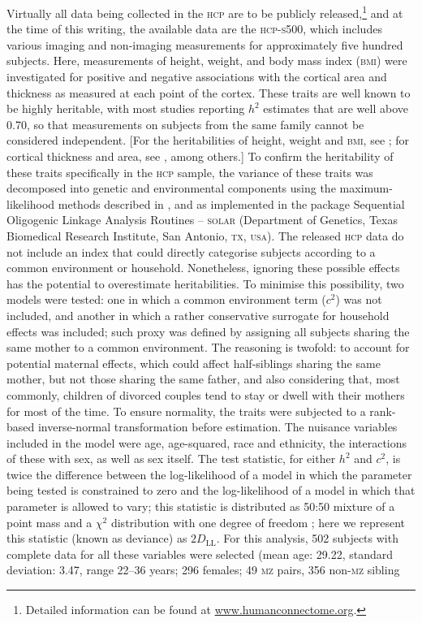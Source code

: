 Virtually all data being collected in the \textsc{hcp} are to be publicly released,\footnote{Detailed information can be found at \href{http://www.humanconnectome.org}{www.humanconnectome.org}.} and at the time of this writing, the available data are the \textsc{hcp-s500}, which includes various imaging and non-imaging measurements for approximately five hundred subjects. Here, measurements of height, weight, and body mass index (\textsc{bmi}) \citep{Barch2013} were investigated for positive and negative associations with the cortical area and thickness as measured at each point of the cortex. These traits are well known to be highly heritable, with most studies reporting $h^2$ estimates that are well above 0.70, so that measurements on subjects from the same family cannot be considered independent. [For the heritabilities of height, weight and \textsc{bmi}, see \citet{Farooqi2005, Visscher2006, Walley2006, Silventoinen2009, Silventoinen2012, Min2013}; for cortical thickness and area, see \citet{Panizzon2009, Winkler2010, Joshi2011, Eyler2011, Eyler2012, Kremen2013, McKay2014}, among others.] To confirm the heritability of these traits specifically in the \textsc{hcp} sample, the variance of these traits was decomposed into genetic and environmental components using the maximum-likelihood methods described in \citet{Almasy1998}, and as implemented in the package Sequential Oligogenic Linkage Analysis Routines -- \textsc{solar} (Department of Genetics, Texas Biomedical Research Institute, San Antonio, \textsc{tx}, \textsc{usa}). The released \textsc{hcp} data do not include an index that could directly categorise subjects according to a common environment or household. Nonetheless, ignoring these possible effects has the potential to overestimate heritabilities. To minimise this possibility, two models were tested: one in which a common environment term ($c^2$) was not included, and another in which a rather conservative surrogate for household effects was included; such proxy was defined by assigning all subjects sharing the same mother to a common environment. The reasoning is twofold: to account for potential maternal effects, which could affect half-siblings sharing the same mother, but not those sharing the same father, and also considering that, most commonly, children of divorced couples tend to stay or dwell with their mothers for most of the time. To ensure normality, the traits were subjected to a rank-based inverse-normal transformation before estimation. The nuisance variables included in the model were age, age-squared, race and ethnicity, the interactions of these with sex, as well as sex itself. The test statistic, for either $h^2$ and $c^2$, is twice the difference between the log-likelihood of a model in which the parameter being tested is constrained to zero and the log-likelihood of a model in which that parameter is allowed to vary; this statistic is distributed as 50:50 mixture of a point mass and a $\chi^2$ distribution with one degree of freedom \citep{Self1987}; here we represent this statistic (known as deviance) as $2D_{\text{LL}}$. For this analysis, 502 subjects with complete data for all these variables were selected (mean age: 29.22, standard deviation: 3.47, range 22--36 years; 296 females; 49 \textsc{mz} pairs, 356 non-\textsc{mz} sibling 